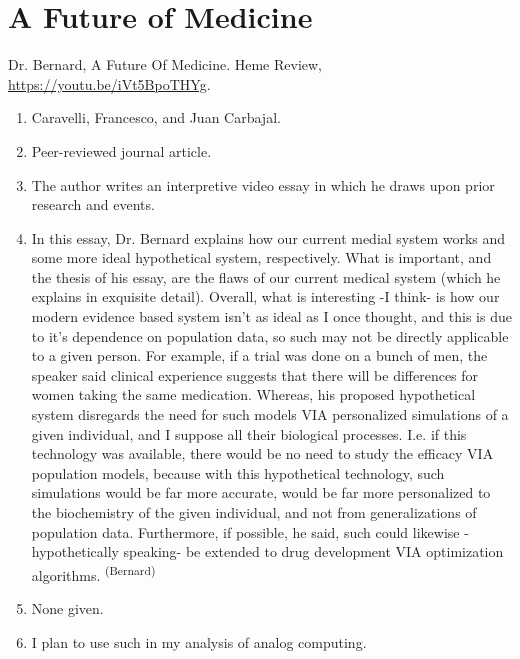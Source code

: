 \section*{A Future of Medicine}
Dr. Bernard, A Future Of Medicine. Heme Review, \url{https://youtu.be/iVt5BpoTHYg}.
\begin{enumerate}
    \item Caravelli, Francesco, and Juan Carbajal.
    \item Peer-reviewed journal article.
    \item The author writes an interpretive video essay in which he draws upon prior research and events.
    \item In this essay, Dr. Bernard explains how our current medial system works and some more ideal hypothetical system, respectively. What is important, and the thesis of his essay, are the flaws of our current medical system (which he explains in exquisite detail). Overall, what is interesting -I think- is how our modern evidence based system isn’t as ideal as I once thought, and this is due to it’s dependence on population data, so such may not be directly applicable to a given person. For example, if a trial was done on a bunch of men, the speaker said clinical experience suggests that there will be differences for women taking the same medication. Whereas, his proposed hypothetical system disregards the need for such models VIA personalized simulations of a given individual, and I suppose all their biological processes. I.e. if this technology was available, there would be no need to study the efficacy VIA population models, because with this hypothetical technology, such simulations would be far more accurate, would be far more personalized to the biochemistry of the given individual, and not from generalizations of population data. Furthermore, if possible, he said, such could likewise -hypothetically speaking- be extended to drug development VIA optimization algorithms. \textsuperscript{(Bernard)}
    \item None given. 
    \item I plan to use such in my analysis of analog computing. 
\end{enumerate}


